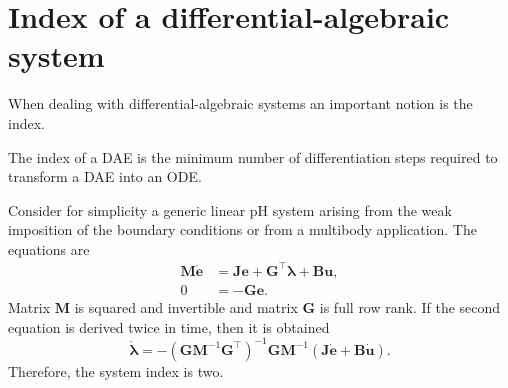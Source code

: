 \section{Index of a differential-algebraic system}\label{sec:DAE_index}
When dealing with differential-algebraic systems an important notion is the index.
\begin{definition}
	The index of a DAE is the minimum number of differentiation steps required to transform a DAE into an ODE.
\end{definition}
Consider for simplicity a generic linear pH system arising from the weak imposition of the boundary conditions or from a multibody application. The equations are
\begin{equation*}
\begin{aligned}
\mathbf{M} \dot{\mathbf{e}} &=  \mathbf{J}\mathbf{e} + \mathbf{G}^\top \bm{\lambda} + \mathbf{B}\mathbf{u}, \\ 
0 &= -\mathbf{G}\mathbf{e}.
\end{aligned}
\end{equation*}
Matrix $\mathbf{M}$ is squared and invertible and matrix $\mathbf{G}$ is full row rank. If the second equation is derived twice in time, then it is obtained
\[\dot{\bm{\lambda}} = - (\mathbf{G} \mathbf{M}^{-1} \mathbf{G}^\top)^{-1} \mathbf{G} \mathbf{M}^{-1} (\mathbf{J} \dot{\mathbf{e}} + \mathbf{B}\dot{\mathbf{u}}).
\]
Therefore, the system index is two.  